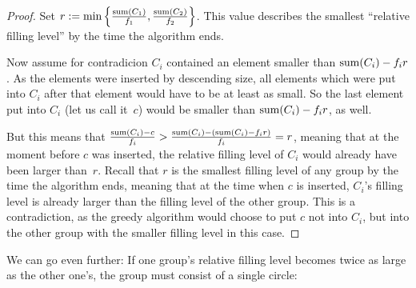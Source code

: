 \documentclass[a4paper,style=print,bibliography=totoc,nexus,lnum,extramargin]{tubsbook}
\begin{document}
\begin{proof}
    Set $r := \min\left\{\frac{\operatorname{sum}(C_1)}{f_1},\frac{\operatorname{sum}(C_2)}{f_2}\right\}$. This value describes the smallest “relative filling level” by the time the algorithm ends.

    Now assume for contradicion $C_i$ contained an element smaller than $\operatorname{sum}(C_i) - f_i r$. As the elements were inserted by descending size, all elements which were put into $C_i$ after that element would have to be at least as small. So the last element put into $C_i$ (let us call it~$c$) would be smaller than $\operatorname{sum}(C_i) - f_i r$, as well.

    But this means that $\frac{\operatorname{sum}(C_i) - c}{f_i} > \frac{\operatorname{sum}(C_i) - (\operatorname{sum}(C_i) - f_i r)}{f_i} = r$, meaning that at the moment before $c$ was inserted, the relative filling level of $C_i$ would already have been larger than~$r$.
    Recall that $r$ is the smallest filling level of any group by the time the algorithm ends, meaning that at the time when $c$ is inserted, $C_i$'s filling level is already larger than the filling level of the other group.
    This is a contradiction, as the greedy algorithm would choose to put $c$ not into $C_i$, but into the other group with the smaller filling level in this case.
\end{proof}

We can go even further: If one group's relative filling level becomes twice as large as the other one's, the group must consist of a single circle:
\end{document}
